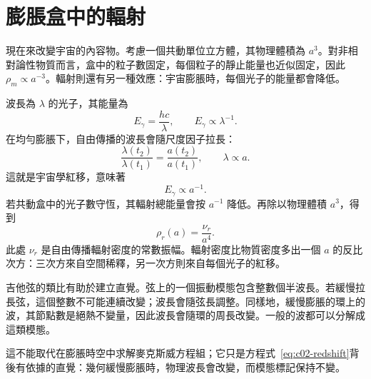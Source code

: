 \begin{classroomqa}
\end{classroomqa}

\section{膨脹盒中的輻射}

現在來改變宇宙的內容物。考慮一個共動單位立方體，其物理體積為 \(a^3\)。對非相對論性物質而言，盒中的粒子數固定，每個粒子的靜止能量也近似固定，因此 \(\rho_m\propto a^{-3}\)。輻射則還有另一種效應：宇宙膨脹時，每個光子的能量都會降低。

波長為 \(\lambda\) 的光子，其能量為
\begin{equation}
E_\gamma=\frac{hc}{\lambda},
\qquad
E_\gamma\propto\lambda^{-1}.
\label{eq:c02-photon-energy}
\end{equation}
在均勻膨脹下，自由傳播的波長會隨尺度因子拉長：
\begin{equation}
\frac{\lambda(t_2)}{\lambda(t_1)}
=\frac{a(t_2)}{a(t_1)},
\qquad
\lambda\propto a.
\label{eq:c02-redshift}
\end{equation}
這就是宇宙學紅移，意味著
\begin{equation}
E_\gamma\propto a^{-1}.
\label{eq:c02-photon-redshift}
\end{equation}
若共動盒中的光子數守恆，其輻射總能量會按 \(a^{-1}\) 降低。再除以物理體積 \(a^3\)，得到
\begin{equation}
\boxed{\rho_r(a)=\frac{\nu_r}{a^4}.}
\label{eq:c02-radiation-density}
\end{equation}
此處 \(\nu_r\) 是自由傳播輻射密度的常數振幅。輻射密度比物質密度多出一個 \(a\) 的反比次方：三次方來自空間稀釋，另一次方則來自每個光子的紅移。

吉他弦的類比有助於建立直覺。弦上的一個振動模態包含整數個半波長。若緩慢拉長弦，這個整數不可能連續改變；波長會隨弦長調整。同樣地，緩慢膨脹的環上的波，其節點數是絕熱不變量，因此波長會隨環的周長改變。一般的波都可以分解成這類模態。

這不能取代在膨脹時空中求解麥克斯威方程組；它只是方程式~\eqref{eq:c02-redshift}背後有依據的直覺：幾何緩慢膨脹時，物理波長會改變，而模態標記保持不變。

